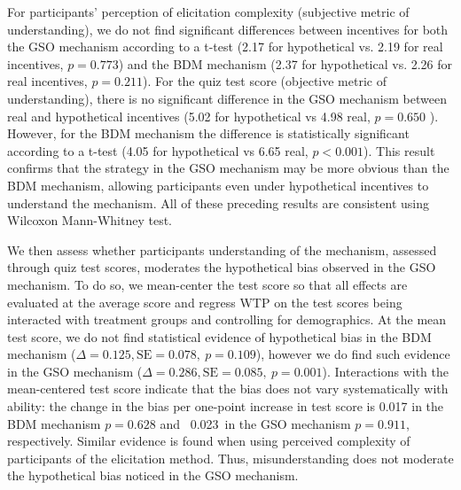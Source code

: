 \documentclass[12pt]{article}
\begin{document}
For participants' perception of elicitation complexity (subjective metric of understanding), we do not find significant differences between incentives for both the GSO mechanism according to a t-test (2.17 for hypothetical vs. 2.19 for real incentives, \(p =0.773\)) and the BDM mechanism (2.37 for hypothetical vs. 2.26 for real incentives, \(p =0.211\)). For the quiz test score (objective metric of understanding), there is no significant difference in the GSO mechanism  between real and hypothetical incentives (5.02 for hypothetical vs 4.98 real, \(p =0.650\) ). However,  for the BDM mechanism the difference is statistically significant according to a t-test (4.05 for hypothetical vs 6.65 real, \(p<0.001\)). This result confirms that the strategy in the GSO mechanism may be more obvious than the BDM mechanism, allowing participants even under hypothetical incentives to understand the mechanism. All of these preceding results are consistent using Wilcoxon Mann-Whitney test.

We then assess whether participants understanding of the mechanism, assessed through quiz test scores, moderates the hypothetical bias observed in the GSO mechanism. To do so, we mean-center the test score so that all effects are evaluated at the average score and regress WTP on the test scores being interacted with treatment groups and controlling for demographics. At the mean test score, we do not find statistical evidence of hypothetical bias in the BDM mechanism (\(\Delta = 0.125, \text{SE} = 0.078,\ p = 0.109\)), however we do find such evidence in the GSO mechanism (\(\Delta = 0.286, \text{SE} = 0.085,\ p = 0.001\)).  Interactions with the mean-centered test score indicate that the bias does not vary systematically with ability: the change in the bias per one-point increase in test score is 0.017 in the BDM mechanism \(p=0.628\) and \ 0.023\ in the GSO mechanism \(p=0.911\), respectively. Similar evidence is found when using perceived complexity of participants of the elicitation method.
Thus, misunderstanding does not moderate the hypothetical bias noticed in the GSO mechanism. 
\end{document}
